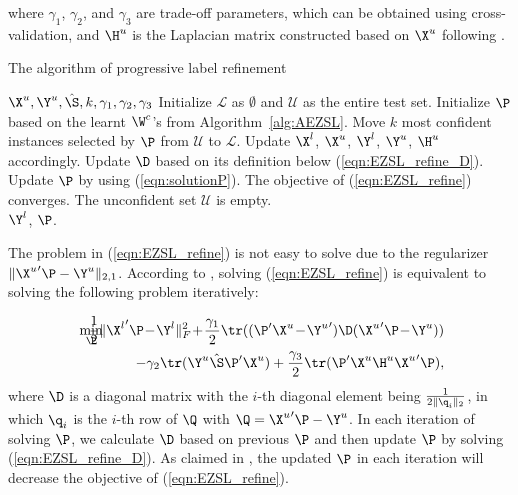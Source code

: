 \documentclass[journal]{IEEEtran}
\begin{document}
\noindent where $\gamma_1$, $\gamma_2$, and $\gamma_3$ are trade-off parameters, which can be obtained using cross-validation, and $\H^u$ is the Laplacian matrix constructed based on $\X^u$ following \cite{li2015semi}.

\setlength{\textfloatsep}{3pt}
\begin{algorithm}[t]
   \caption{The algorithm of progressive label refinement}
   \label{alg:PRZSL}
\begin{algorithmic}[1]
    $\X^u, \Y^u, \hat{\S}, k, \gamma_1, \gamma_2, \gamma_3$
   \STATE Initialize $\mathcal{L}$ as $\emptyset$ and $\mathcal{U}$ as the entire test set. Initialize $\P$ based on the learnt $\W^c$'s from Algorithm~\ref{alg:AEZSL}.
   \REPEAT
      \STATE Move $k$ most confident instances selected by $\P$ from $\mathcal{U}$ to $\mathcal{L}$. Update $\X^l$, $\X^u$, $\Y^l$, $\Y^u$, $\H^u$ accordingly.
   	  \REPEAT
   	  \STATE Update $\D$ based on its definition below (\ref{eqn:EZSL_refine_D}).
      \STATE Update $\P$ by using (\ref{eqn:solutionP}).      
      \UNTIL The objective of (\ref{eqn:EZSL_refine}) converges.
   \UNTIL The unconfident set $\mathcal{U}$ is empty. \\        
    $\Y^l$, $\P$.
\end{algorithmic}
\label{alg:RKLRR}
\end{algorithm}

The problem in (\ref{eqn:EZSL_refine}) is not easy to solve due to the regularizer $\|{\X^u}'\P-\Y^u\|_{2,1}$. According to \cite{nie2010efficient}, solving (\ref{eqn:EZSL_refine}) is equivalent to solving the following problem iteratively:

\vspace{-15pt}
\begin{eqnarray} \label{eqn:EZSL_refine_D}
\min_{\P} \!\!\!\!\!\!\!\!\!\!\!\!&&\frac{1}{2}\|{\X^l}'\P\!-\!\Y^l\|_F^2 \!+\!\frac{\gamma_1}{2}\tr((\P'\X^u\!-\!{\Y^u}')\D({\X^u}'\P\!-\!\Y^u))\nonumber\\
&&-\gamma_2\tr(\Y^u\hat{\S}\P'\X^u)+\frac{\gamma_3}{2}\tr(\P'\X^u\H^u{\X^u}'\P),
\end{eqnarray}
\noindent where $\D$ is a diagonal matrix with the $i$-th diagonal element being $\frac{1}{2\|\q_i\|_2}$, in which $\q_i$ is the $i$-th row of $\Q$ with $\Q={\X^u}'\P-\Y^u$. In each iteration of solving $\P$, we calculate $\D$ based on previous $\P$ and then update $\P$ by solving (\ref{eqn:EZSL_refine_D}). As claimed in \cite{nie2010efficient}, the updated $\P$ in each iteration will decrease the objective of (\ref{eqn:EZSL_refine}).
\end{document}
